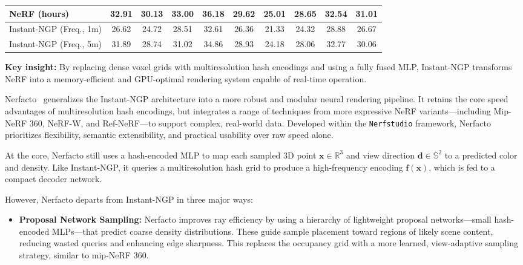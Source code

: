 \begin{enrichment}
\begin{enrichment}
\begin{table}[H]
\begin{tabular}{lcccccccc|c}
            NeRF (hours)            & 32.91 & 30.13 & 33.00 & 36.18 & 29.62 & 25.01 & 28.65 & 32.54 & 31.01 \\
            \midrule
            Instant-NGP (Freq., 1m) & 26.62 & 24.72 & 28.51 & 32.61 & 26.36 & 21.33 & 24.32 & 28.88 & 26.67 \\
            Instant-NGP (Freq., 5m) & 31.89 & 28.74 & 31.02 & 34.86 & 28.93 & 24.18 & 28.06 & 32.77 & 30.06 \\
            \bottomrule
        \end{tabular}
    \end{table}
    
    \medskip
    \noindent
    \textbf{Key insight:} By replacing dense voxel grids with multiresolution hash encodings and using a fully fused MLP, Instant-NGP transforms NeRF into a memory-efficient and GPU-optimal rendering system capable of real-time operation.
    
\end{enrichment}

\begin{enrichment}
    \label{enr:subsec_chapter23_nerfacto}
    
    Nerfacto~\cite{tancik2023_nerfacto} generalizes the Instant-NGP architecture into a more robust and modular neural rendering pipeline. It retains the core speed advantages of multiresolution hash encodings, but integrates a range of techniques from more expressive NeRF variants—including Mip-NeRF 360, NeRF-W, and Ref-NeRF—to support complex, real-world data. Developed within the \texttt{Nerfstudio} framework, Nerfacto prioritizes flexibility, semantic extensibility, and practical usability over raw speed alone.
    
    \medskip
    
    At the core, Nerfacto still uses a hash-encoded MLP to map each sampled 3D point \( \mathbf{x} \in \mathbb{R}^3 \) and view direction \( \mathbf{d} \in \mathbb{S}^2 \) to a predicted color and density. Like Instant-NGP, it queries a multiresolution hash grid to produce a high-frequency encoding \( \mathbf{f}(\mathbf{x}) \), which is fed to a compact decoder network.
    
    \medskip
    
    However, Nerfacto departs from Instant-NGP in three major ways:
    
    \begin{itemize}
        \item \textbf{Proposal Network Sampling:} Nerfacto improves ray efficiency by using a hierarchy of lightweight proposal networks—small hash-encoded MLPs—that predict coarse density distributions. These guide sample placement toward regions of likely scene content, reducing wasted queries and enhancing edge sharpness. This replaces the occupancy grid with a more learned, view-adaptive sampling strategy, similar to mip-NeRF 360.
        

\end{itemize}
\end{enrichment}
\end{enrichment}
